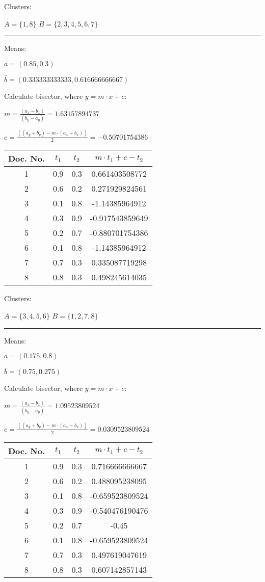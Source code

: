 \documentclass[11pt]{article}
\newcommand{\sectionline}{%
  \nointerlineskip \vspace{\baselineskip}%
  \rule{0.5\linewidth}{.7pt}\hspace{\fill}%
  \par\nointerlineskip \vspace{\baselineskip}
}
\begin{document}
Clusters:

$A = \{1,8\}$
$B = \{2,3,4,5,6,7\}$

\sectionline

Means:

$\bar{a} = (0.85, 0.3)$

$\bar{b} = (0.333333333333, 0.616666666667)$

Calculate bisector, where $y = m \cdot x + c$:

$m = \frac{(a_x - b_x)}{(b_y - a_y)} = 1.63157894737$

$c = \frac{((a_y+b_y) - m \cdot (a_x+b_x))}{2} = -0.50701754386$

\begin{tabular}{c | c | c | c}
Doc. No. & $t_1$ & $t_2$ & $m \cdot t_1 + c - t_2$ \\
\hline
1 & 0.9 & 0.3 & 0.661403508772 \\
2 & 0.6 & 0.2 & 0.271929824561 \\
3 & 0.1 & 0.8 & -1.14385964912 \\
4 & 0.3 & 0.9 & -0.917543859649 \\
5 & 0.2 & 0.7 & -0.880701754386 \\
6 & 0.1 & 0.8 & -1.14385964912 \\
7 & 0.7 & 0.3 & 0.335087719298 \\
8 & 0.8 & 0.3 & 0.498245614035 \\
\end{tabular}

Clusters:

$A = \{3,4,5,6\}$
$B = \{1,2,7,8\}$

\sectionline

Means:

$\bar{a} = (0.175, 0.8)$

$\bar{b} = (0.75, 0.275)$

Calculate bisector, where $y = m \cdot x + c$:

$m = \frac{(a_x - b_x)}{(b_y - a_y)} = 1.09523809524$

$c = \frac{((a_y+b_y) - m \cdot (a_x+b_x))}{2} = 0.0309523809524$

\begin{tabular}{c | c | c | c}
Doc. No. & $t_1$ & $t_2$ & $m \cdot t_1 + c - t_2$ \\
\hline
1 & 0.9 & 0.3 & 0.716666666667 \\
2 & 0.6 & 0.2 & 0.488095238095 \\
3 & 0.1 & 0.8 & -0.659523809524 \\
4 & 0.3 & 0.9 & -0.540476190476 \\
5 & 0.2 & 0.7 & -0.45 \\
6 & 0.1 & 0.8 & -0.659523809524 \\
7 & 0.7 & 0.3 & 0.497619047619 \\
8 & 0.8 & 0.3 & 0.607142857143 \\
\end{tabular}
\end{document}
